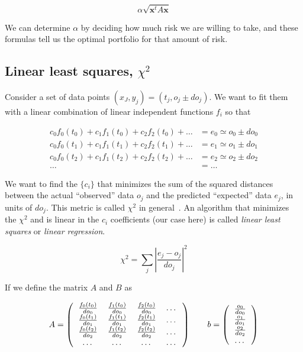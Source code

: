 \documentclass[justified,sixbynine]{tufte-book}
\theoremstyle{plain}%
\theoremstyle{definition}
\theoremstyle{remark}
\begin{document}
\begin{fullwidth}
\begin{equation}
\alpha \sqrt{\mathbf{x}^t A \mathbf{x}}
\end{equation}

We can determine $\alpha$ by deciding how much risk we are willing to take, and these formulas tell us the optimal portfolio for that amount of risk.


\goodbreak\subsection{Linear least squares, $\chi^2$}


Consider a set of data points $(x_J,y_j) = (t_j,o_j \pm do_j)$. We want to fit them with a linear combination of linear independent functions $f_i$ so that

\begin{align}
c_0 f_0(t_0) + c_1 f_1(t_0) + c_2 f_2(t_0) +  \dots &= e_0 \simeq o_0 \pm do_0\\
c_0 f_0(t_1) + c_1 f_1(t_1) + c_2 f_2(t_1) +  \dots &= e_1 \simeq o_1 \pm do_1\\
c_0 f_0(t_2) + c_1 f_1(t_2) + c_2 f_2(t_2) +  \dots &= e_2 \simeq o_2 \pm do_2\\
\dots &=\dots 
\end{align}

We want to find the $\{c_i\}$ that minimizes the sum of the squared distances between the actual ``observed'' data $o_j$ and the predicted ``expected'' data $e_j$, in units of $do_j$. This metric is called $\chi^2$ in general~\cite{chi2}. An algorithm that minimizes the $\chi^2$  and is linear in the $c_i$ coefficients (our case here) is called {\it linear least squares} or {\it linear regression}.

\begin{equation}
\chi^2 = \sum_j \left|\frac{e_j - o_j}{do_j}\right|^2
\end{equation}

If we define the matrix $A$ and $B$ as

\begin{equation}
A=\left(
\begin{tabular}{cccc}
$\frac{f_0(t_0)}{do_0}$ & $\frac{f_1(t_0)}{do_0}$ & $\frac{f_2(t_0)}{do_0}$ &\dots\\
$\frac{f_0(t_1)}{do_1}$ & $\frac{f_1(t_1)}{do_1}$ & $\frac{f_2(t_1)}{do_1}$ &\dots\\
$\frac{f_0(t_2)}{do_2}$ & $\frac{f_1(t_2)}{do_2}$ & $\frac{f_2(t_2)}{do_2}$ &\dots\\
\dots& \dots& \dots &\dots 
\end{tabular}
\right) \qquad b =
\left(
\begin{tabular}{c}
$\frac{o_0}{do_0}$ \\
$\frac{o_1}{do_1}$ \\
$\frac{o_2}{do_2}$ \\
\dots
\end{tabular}
\right)
\end{equation}


\end{fullwidth}
\end{document}

